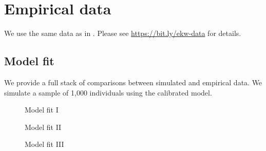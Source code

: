 \section{Empirical data}\label{Empirical data}
We use the same data as in \citet{Keane.1997}. Please see \url{https://bit.ly/ekw-data} for details.

\subsection{Model fit}

We provide a full stack of comparisons between simulated and empirical data. We simulate a sample of 1,000 individuals using the calibrated model.

\begin{figure}[h]\centering
	\caption{Model fit I}\label{Model fit I}
	\hspace{0.3cm}
	\begin{center}
\end{center}
\end{figure}

\begin{figure}[h]\centering
	\caption{Model fit II}\label{Model fit II}
	\hspace{0.3cm}
	\begin{center}
\end{center}
\end{figure}

\begin{figure}[h]\centering
	\caption{Model fit III}\label{Model fit III}
	\hspace{0.3cm}
	\begin{center}
\end{center}
\end{figure}